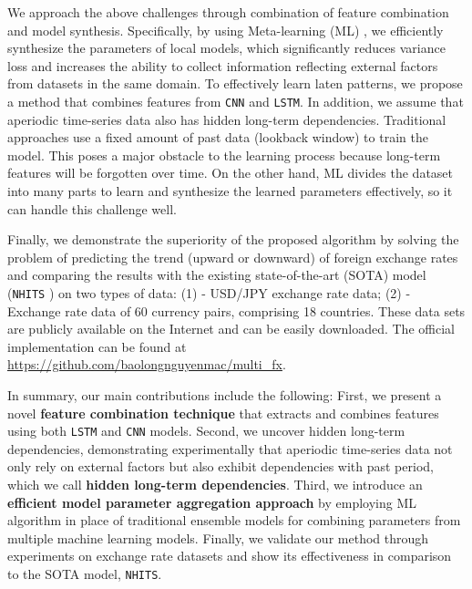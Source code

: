 \documentclass[aps,prb,groupedaddress,twocolumn,showpacs,dvipdfmx,superscriptaddress,pdftex]{revtex4-2}
\begin{document}
We approach the above challenges through combination of feature combination and model synthesis. Specifically, by using Meta-learning (ML) \cite{finn2017model}, we efficiently synthesize the parameters of local models, which significantly reduces variance loss and increases the ability to collect information reflecting external factors from datasets in the same domain. To effectively learn laten patterns, we propose a method that combines features from \verb|CNN| and \verb|LSTM|. In addition, we assume that aperiodic time-series data also has hidden long-term dependencies. Traditional approaches use a fixed amount of past data (lookback window) to train the model. This poses a major obstacle to the learning process because long-term features will be forgotten over time. On the other hand, ML divides the dataset into many parts to learn and synthesize the learned parameters effectively, so it can handle this challenge well.

\vspace{2mm}


Finally, we demonstrate the superiority of the proposed algorithm by solving the problem of predicting the trend (upward or downward) of foreign exchange rates and comparing the results with the existing state-of-the-art (SOTA) model (\verb|NHITS| \cite{challu2023nhits}) on two types of data: (1) - USD/JPY exchange rate data; (2) - Exchange rate data of 60 currency pairs, comprising 18 countries. These data sets are publicly available on the Internet and can be easily downloaded. The official implementation can be found at \url{https://github.com/baolongnguyenmac/multi_fx}.

\vspace{2mm}

In summary, our main contributions include the following: First, we present a novel \textbf{feature combination technique} that extracts and combines features using both \verb|LSTM| and \verb|CNN| models. Second, we uncover hidden long-term dependencies, demonstrating experimentally that aperiodic time-series data not only rely on external factors but also exhibit dependencies with past period, which we call \textbf{hidden long-term dependencies}. Third, we introduce an \textbf{efficient model parameter aggregation approach} by employing ML algorithm in place of traditional ensemble models for combining parameters from multiple machine learning models. Finally, we validate our method through experiments on exchange rate datasets and show its effectiveness in comparison to the SOTA model, \verb|NHITS|.
\end{document}

